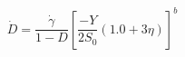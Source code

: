 \documentclass[sn-mathphys,Numbered,draft]{sn-jnl}%
\begin{document}

\begin{equation}
\dot{D}=\frac{\dot{\gamma}}{1-D}\left[\frac{-Y}{2S_0}\left(1.0+3\eta\right)\right]^b
 \end{equation}




\end{document}
